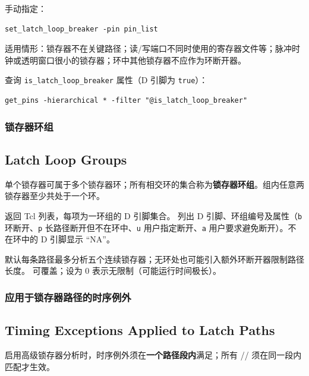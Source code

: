 手动指定：
\begin{lstlisting}
set_latch_loop_breaker -pin pin_list
\end{lstlisting}

适用情形：锁存器不在关键路径；读/写端口不同时使用的寄存器文件等；脉冲时钟或透明窗口很小的锁存器；环中其他锁存器不应作为环断开器。

查询 \texttt{is\_latch\_loop\_breaker} 属性（D 引脚为 \texttt{true}）：
\begin{lstlisting}
get_pins -hierarchical * -filter "@is_latch_loop_breaker"
\end{lstlisting}

\subsubsection{锁存器环组}
\subsection*{Latch Loop Groups}

单个锁存器可属于多个锁存器环；所有相交环的集合称为\textbf{锁存器环组}。组内任意两锁存器至少共处于一个环。


 返回 Tcl 列表，每项为一环组的 D 引脚集合。 列出 D 引脚、环组编号及属性（\texttt{b} 环断开、\texttt{p} 长路径断开但不在环中、\texttt{u} 用户指定断开、\texttt{a} 用户要求避免断开）。不在环中的 D 引脚显示 “NA”。

默认每条路径最多分析五个连续锁存器；无环处也可能引入额外环断开器限制路径长度。 可覆盖；设为 0 表示无限制（可能运行时间极长）。

\subsubsection{应用于锁存器路径的时序例外}
\subsection*{Timing Exceptions Applied to Latch Paths}

启用高级锁存器分析时，时序例外须在\textbf{一个路径段内}满足；所有 // 须在同一段内匹配才生效。

